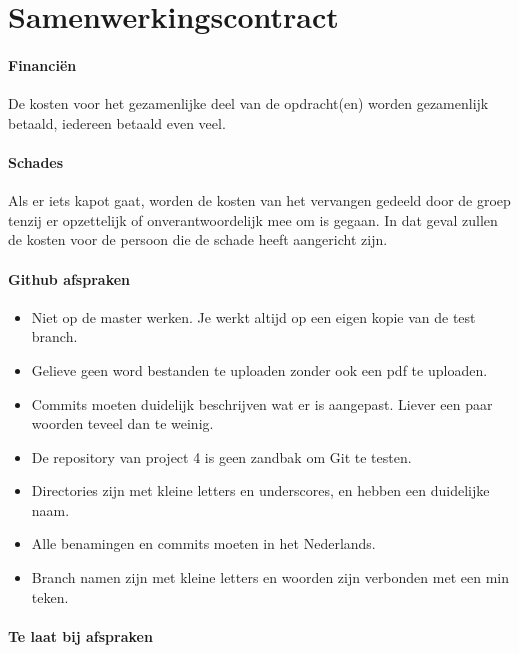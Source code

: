 \documentclass{article}
\begin{document}
\section{Samenwerkingscontract}
\label{chap:Samenwerkingscontract}

\paragraph{Financi\"en}

De kosten voor het gezamenlijke deel van de opdracht(en) worden gezamenlijk betaald, iedereen betaald even veel.

\paragraph{Schades}

Als er iets kapot gaat, worden de kosten van het vervangen gedeeld door de groep tenzij er opzettelijk of onverantwoordelijk mee om is gegaan.
In dat geval zullen de kosten voor de persoon die de schade heeft aangericht zijn.

\paragraph{Github afspraken}

\begin{itemize}
\item Niet op de master werken. Je werkt altijd op een eigen kopie van de test branch.
\item Gelieve geen word bestanden te uploaden zonder ook een pdf te uploaden.
\item Commits moeten duidelijk beschrijven wat er is aangepast. Liever een paar woorden teveel dan te weinig.
\item De repository van project 4 is geen zandbak om Git te testen.
\item Directories zijn met kleine letters en underscores, en hebben een duidelijke naam.
\item Alle benamingen en commits moeten in het Nederlands.
\item Branch namen zijn met kleine letters en woorden zijn verbonden met een min teken.
\end{itemize}

\paragraph{Te laat bij afspraken}
\end{document}

